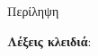 \pagestyle{plain}

\begin{center}
{\LARGE Περίληψη}\\[1cm]
\end{center}

\noindent
\textbf{Λέξεις κλειδιά}: 